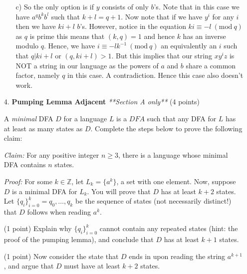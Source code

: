 \documentclass[11pt]{article}
\begin{document}
\begin{enumerate}
\begin{answer}
\begin{enumerate}
    \item[c)] So the only option is if $y$ consists of only $b$'s. Note that in this case we have $a^q b^k b^l$ such that $k + l = q + 1$. Now note that if we have $y^i$ for any $i$ then we have $ki + l$ $b$'s. However, notice in the equation $ki \equiv -l \ (\text{mod} \ q)$ as $q$ is prime this means that $(k, q) = 1$ and hence $k$ has an inverse modulo $q$. Hence, we have $i \equiv -lk^{-1} \ (\text{mod} \ q)$ an equivalently an $i$ such that $q | ki + l$ or $(q, ki + l) > 1$. But this implies that our string $x y^i z$ is NOT a string in our language as the powers of $a$ and $b$ share a common factor, namely $q$ in this case. A contradiction. Hence this case also doesn't work.
\end{enumerate}

    \end{answer}
    
    
    \item [4.] \textbf{Pumping Lemma Adjacent} \textit{**Section A only**} (4 points)

    A \emph{minimal} DFA $D$ for a language $L$ is a $DFA$ such that any DFA for $L$ has at least as many states as $D$.  Complete the steps below to prove the following claim:
    \newline

    \emph{Claim:} For any positive integer $n \geq 3$, there is a language whose minimal DFA contains $n$ states.
    \newline

    \emph{Proof:} For some $k \in \mathbb{Z}$, let $L_k = \{a^k\}$, a set with one element. Now, suppose $D$ is a minimal DFA for $L_k$. You will prove that $D$ has at least $k+2$ states.  Let $\{q_i\}_{i=0}^k = q_0, …, q_k$ be the sequence of states (not necessarily distinct!) that $D$ follows when reading $a^k$. 
    \newline

    (1 point) Explain why $\{q_i\}_{i=0}^k$ cannot contain any repeated states (hint: the proof of the pumping lemma), and conclude that $D$ has at least $k+1$ states.
    
    \begin{answer}
    \end{answer}
    
    \newline

    (1 point) Now consider the state that $D$ ends in upon reading the string $a^{k+1}$, and argue that $D$ must have at least $k+2$ states.
    

\end{enumerate}
\end{document}
